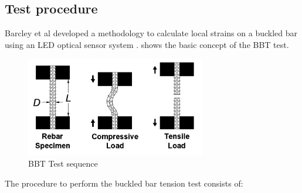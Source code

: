 \subsection{Test procedure}
Barcley et al \cite{Barcley2019} developed a methodology to calculate local strains on a buckled bar using an LED optical sensor system \cite{NorthernDigitalInc.2020}.  shows the basic concept of the BBT test.

\begin{figure}[htbp]
	\centering
	\includegraphics[width=0.7\textwidth]{Chapter-3/figs/BBT_Sequence}
	\caption{BBT Test sequence\cite{Barcley2019}}
	\label{fig:BBTseq}
\end{figure}

The procedure to perform the buckled bar tension test consists of:


